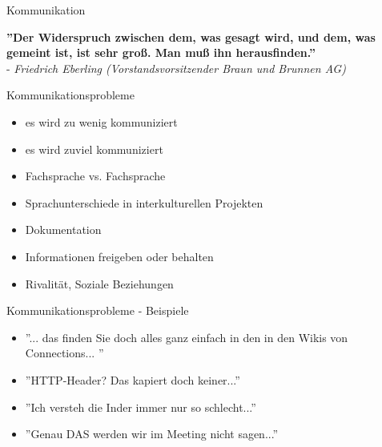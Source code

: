 \documentclass[12pt]{beamer}
\begin{document}

	\begin{frame}{Kommunikation}
		
		\textbf{''Der Widerspruch zwischen dem, was gesagt wird, und dem, was gemeint ist, ist sehr groß. Man muß ihn herausfinden.''}\\ 
		- \textit{Friedrich Eberling (Vorstandsvorsitzender Braun und Brunnen AG)}
	\end{frame}

	\begin{frame}{Kommunikationsprobleme}
		\begin{itemize}
			\item{es wird zu wenig kommuniziert}
			\item{es wird zuviel kommuniziert}
			\item{Fachsprache vs. Fachsprache}
			\item{Sprachunterschiede in interkulturellen Projekten}
			\item{Dokumentation}
			\item{Informationen freigeben oder behalten}
			\item{Rivalität, Soziale Beziehungen}
		\end{itemize}
	\end{frame}
	
	\begin{frame}{Kommunikationsprobleme - Beispiele}
		\begin{itemize}
			\item{''... das finden Sie doch alles ganz einfach in den in den Wikis von Connections... ''}
			\item{''HTTP-Header? Das kapiert doch keiner...''}
			\item{''Ich versteh die Inder immer nur so schlecht...''}
			\item{''Genau DAS werden wir im Meeting nicht sagen...''}
		\end{itemize}

	\end{frame}
	
\end{document}

